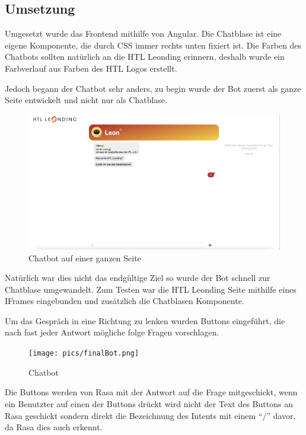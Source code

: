 \subsection{Umsetzung}
Umgesetzt wurde das Frontend mithilfe von Angular.
Die Chatblase ist eine eigene Komponente, die durch CSS immer rechts unten fixiert ist.
Die Farben des Chatbots sollten natürlich an die HTL Leonding erinnern, deshalb wurde ein Farbverlauf aus Farben des HTL Logos erstellt.

Jedoch begann der Chatbot sehr anders, zu begin wurde der Bot zuerst als ganze Seite entwickelt und nicht nur als Chatblase.
\begin{figure}[hbt!]
    \centering
    \includegraphics[scale=0.2]{pics/fullPageBot}
    \caption{Chatbot auf einer ganzen Seite}
    \label{fig:impl:conceptBotFullPage}
\end{figure}

Natürlich war dies nicht das endgültige Ziel so wurde der Bot schnell zur Chatblase umgewandelt.
Zum Testen war die HTL Leonding Seite mithilfe eines IFrames eingebunden und zusätzlich die Chatblasen Komponente.

Um das Gespräch in eine Richtung zu lenken wurden Buttons eingeführt, die nach fast jeder Antwort mögliche folge Fragen vorschlagen.

\begin{figure}[hbt!]
    \centering
    \texttt{[image: pics/finalBot.png]}
    \caption{Chatbot}
    \label{fig:impl:bot}
\end{figure}

Die Buttons werden von Rasa mit der Antwort auf die Frage mitgeschickt, wenn ein Benutzter auf einen der Buttons drückt wird nicht der Text des Buttons an Rasa geschickt sondern direkt die Bezeichnung des Intents mit einem ``/'' davor, da Rasa dies auch erkennt.

